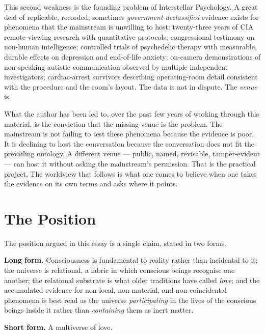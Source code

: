 \documentclass[11pt,a4paper]{article}
\begin{document}
This second weakness is the founding problem of Interstellar
Psychology. A great deal of replicable, recorded, sometimes
\emph{government-declassified} evidence exists for phenomena that
the mainstream is unwilling to host: twenty-three years of CIA
remote-viewing research with quantitative protocols; congressional
testimony on non-human intelligence; controlled trials of
psychedelic therapy with measurable, durable effects on depression
and end-of-life anxiety; on-camera demonstrations of non-speaking
autistic communication observed by multiple independent
investigators; cardiac-arrest survivors describing operating-room
detail consistent with the procedure and the room's layout. The
data is not in dispute. The \emph{venue} is.

What the author has been led to, over the past few years of
working through this material, is the conviction that the missing
venue is the problem. The mainstream is not failing to test these
phenomena because the evidence is poor. It is declining to host
the conversation because the conversation does not fit the
prevailing ontology. A different venue --- public, named,
revisable, tamper-evident --- can host it without asking the
mainstream's permission. That is the practical project. The
worldview that follows is what one comes to believe when one takes
the evidence on its own terms and asks where it points.

\section{The Position}

The position argued in this essay is a single claim, stated in two
forms.

\begin{notebox}
\textbf{Long form.}
Consciousness is fundamental to reality rather than incidental to
it; the universe is relational, a fabric in which conscious beings
recognise one another; the relational substrate is what older
traditions have called \emph{love}; and the accumulated evidence
for non-local, non-material, and non-coincidental phenomena is best
read as the universe \emph{participating} in the lives of the
conscious beings inside it rather than \emph{containing} them as
inert matter.

\textbf{Short form.} A multiverse of love.
\end{notebox}
\end{document}
